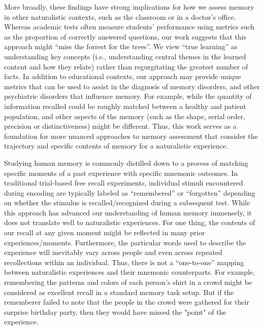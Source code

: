 
More broadly, these findings have strong implications for how we assess memory in other naturalistic contexts, such as the classroom or in a doctor's office.  Whereas academic tests often measure students' performance using metrics such as the proportion of correctly answered questions, our work suggests that this approach might ``miss the forrest for the trees''. We view ``true learning'' as understanding key concepts (i.e., understanding central themes in the learned content and how they relate) rather than regurgitating the greatest number of facts. In addition to educational contexts, our approach may provide unique metrics that can be used to assist in the diagnosis of memory disorders, and other psychiatric disorders that influence memory. For example, while the quantity of information recalled could be roughly matched between a healthy and patient population, and other aspects of the memory (such as the shape, serial order, precision or distinctiveness) might be different. Thus, this work serves as a foundation for more nuanced approaches to memory assessment that consider the trajectory and specific contents of memory for a naturalistic experience.




Studying human memory is commonly distilled down to a process of matching specific moments of a past experience with specific mnemonic outcomes.  In traditional trial-based free recall experiments, individual stimuli encountered during encoding are typically labeled as ``remembered'' or ``forgotten'' depending on whether the stimulus is recalled/recognized during a subsequent test. While this approach has advanced our understanding of human memory immensely, it does not translate well to naturalistic experiences. For one thing, the contents of our recall at any given moment might be reflected in many prior experiences/moments. Furthermore, the particular words used to describe the experience will inevitably vary across people and even across repeated recollections within an individual. Thus, there is not a ``one-to-one'' mapping between naturalistic experiences and their mnemonic counterparts. For example, remembering the patterns and colors of each person's shirt in a crowd might be considered as excellent recall in a standard memory task setup. But if the rememberer failed to note that the people in the crowd were gathered for their surprise birthday party, then they would have missed the "point" of the experience.

